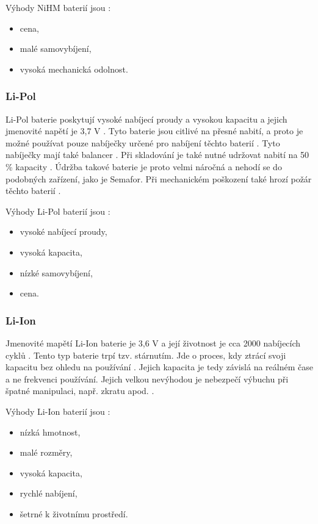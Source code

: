Výhody NiHM baterií jsou \cite{akumulatory}:
\begin{itemize}
  \item cena,
  \item malé samovybíjení,
  \item vysoká mechanická odolnost.
\end{itemize}

\subsubsection{Li-Pol}
Li-Pol baterie poskytují vysoké nabíjecí proudy a vysokou kapacitu a jejich jmenovité napětí je 3,7 V \cite{akumulatory}. Tyto baterie jsou citlivé na přesné nabití, a proto 
je možné používat pouze nabíječky určené pro nabíjení těchto baterií \cite{akumulatory}. Tyto nabíječky mají také balancer \cite{akumulatory}. Při skladování je také nutné 
udržovat nabití na 50 \% kapacity \cite{akumulatory}. Údržba takové baterie je proto velmi náročná a nehodí se do podobných zařízení, jako je Semafor. Při mechanickém poškození 
také hrozí požár těchto baterií \cite{akumulatory}.

Výhody Li-Pol baterií jsou \cite{akumulatory}:
\begin{itemize}
  \item vysoké nabíjecí proudy, 
  \item vysoká kapacita, 
  \item nízké samovybíjení,
  \item cena.
\end{itemize}

\subsubsection{Li-Ion}
Jmenovité mapětí Li-Ion baterie je 3,6 V a její životnost je cca 2000 nabíjecích cyklů \cite{Li-Ion}. Tento typ baterie trpí tzv. stárnutím. Jde o proces, kdy ztrácí 
svoji kapacitu bez ohledu na používání \cite{Li-Ion}. Jejich kapacita je tedy závislá na reálném čase a ne frekvenci používání. Jejich velkou nevýhodou je nebezpečí 
výbuchu při špatné manipulaci, např. zkratu apod. \cite{Li-Ion}. 

Výhody Li-Ion baterií jsou \cite{Li-Ion}:
\begin{itemize}
  \item nízká hmotnost,
  \item malé rozměry,
  \item vysoká kapacita,
  \item rychlé nabíjení,
  \item šetrné k životnímu prostředí. 
\end{itemize}

